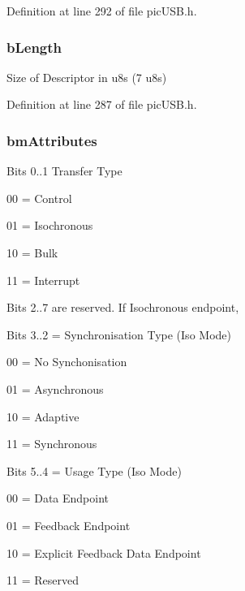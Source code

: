 Definition at line 292 of file pic\-U\-S\-B.\-h.

\hypertarget{struct_u_s_b___endpoint___descriptor_a904ce9aea3e1db94a9a1ec5a0a22b65d}{
\subsubsection[{b\-Length}]{ b\-Length}}\label{struct_u_s_b___endpoint___descriptor_a904ce9aea3e1db94a9a1ec5a0a22b65d}
Size of Descriptor in u8s (7 u8s) 

Definition at line 287 of file pic\-U\-S\-B.\-h.

\hypertarget{struct_u_s_b___endpoint___descriptor_a2733c047911192e6e1630eb85167cd42}{
\subsubsection[{bm\-Attributes}]{ bm\-Attributes}}\label{struct_u_s_b___endpoint___descriptor_a2733c047911192e6e1630eb85167cd42}
Bits 0..1 Transfer Type\par

\begin{DoxyItemize}
\item 00 = Control
\item 01 = Isochronous
\item 10 = Bulk
\item 11 = Interrupt
\end{DoxyItemize}\par
Bits 2..7 are reserved. If Isochronous endpoint,\par
Bits 3..2 = Synchronisation Type (Iso Mode)\par

\begin{DoxyItemize}
\item 00 = No Synchonisation
\item 01 = Asynchronous
\item 10 = Adaptive
\item 11 = Synchronous
\end{DoxyItemize}\par
Bits 5..4 = Usage Type (Iso Mode)
\begin{DoxyItemize}
\item 00 = Data Endpoint
\item 01 = Feedback Endpoint
\item 10 = Explicit Feedback Data Endpoint
\item 11 = Reserved
\end{DoxyItemize}

